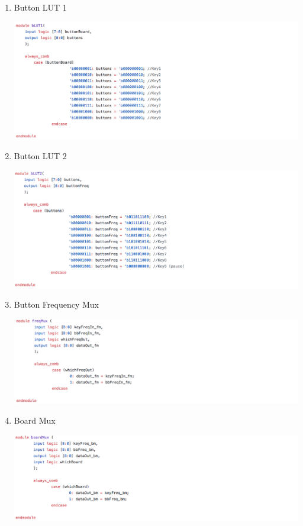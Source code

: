 \documentclass[a4paper]{article}
\begin{document}
\begin{enumerate}
\item Button LUT 1 

\includegraphics[width=6 in]{./Images/Archive/5-BLUT1.png}

\item Button LUT 2

\includegraphics[width=6 in]{./Images/Archive/6-BLUT2.png}

\item Button Frequency Mux

\includegraphics[width=6 in]{./Images/Archive/7-FrequencyMux.png}

\item Board Mux

\includegraphics[width=6 in]{./Images/Archive/8-BoardMux.png}


\end{enumerate}
\end{document}
